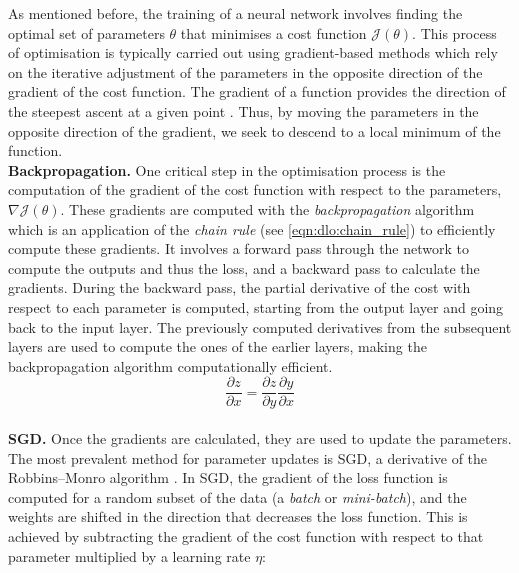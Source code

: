 As mentioned before, the training of a neural network involves finding the
optimal set of parameters $\theta$ that minimises a cost function
$\mathcal{J}(\theta)$. This process of optimisation is typically carried out
using gradient-based methods which rely on the iterative adjustment of the
parameters in the opposite direction of the gradient of the cost function. The
gradient of a function provides the direction of the steepest ascent at a given
point \cite{boyd2004convex}. Thus, by moving the parameters in the opposite
direction of the gradient, we seek to descend to a local minimum of the
function.\\

\noindent \textbf{Backpropagation.} One critical step in the optimisation
process is the computation of the gradient of the cost function with respect to
the parameters, $\nabla \mathcal{J}(\theta)$. These gradients are computed with
the \emph{backpropagation} algorithm \cite{rumelhart1986learning} which is an
application of the \emph{chain rule} (see \cref{eqn:dlo:chain_rule}) to
efficiently compute these gradients. It involves a forward pass through the
network to compute the outputs and thus the loss, and a backward pass to
calculate the gradients. During the backward pass, the partial derivative of the
cost with respect to each parameter is computed, starting from the output layer
and going back to the input layer. The previously computed derivatives from the
subsequent layers are used to compute the ones of the earlier layers,  
making the backpropagation algorithm computationally efficient.\\

\begin{equation}
  \label{eqn:dlo:chain_rule}
  \frac{\partial z}{\partial x} = \frac{\partial z}{\partial y} \frac{\partial y}{\partial x}
\end{equation}\\

\noindent \textbf{\acl{SGD}.} Once the gradients are calculated, they are used
to update the parameters. The most prevalent method for parameter updates is
\acf{SGD}, a derivative of the Robbins–Monro algorithm
\cite{robbins1951stochastic}. In \ac{SGD}, the gradient of the loss function is
computed for a random subset of the data (a \emph{batch} or \emph{mini-batch}),
and the weights are shifted in the direction that decreases the loss function.
This is achieved by subtracting the gradient of the cost function with respect
to that parameter multiplied by a learning rate $\eta$:\\

